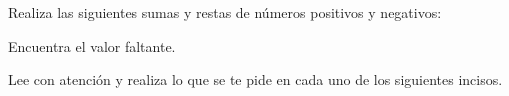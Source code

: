 \documentclass[11pt,addpoints]{exam}
\begin{document}
\begin{questions}
    \begin{parts}
        
        
    \end{parts}

    Realiza las siguientes sumas y restas de n\'umeros positivos y negativos:
    \begin{parts}
        
        
    \end{parts}

    Encuentra el valor faltante.
    \begin{multicols}{2}
        \begin{parts}
            
            
        \end{parts}
    \end{multicols}

    Lee con atenci\'on y realiza lo que se te pide en cada uno de los siguientes incisos.
    \begin{multicols}{2}
        \begin{parts}
            
            
        \end{parts}
    \end{multicols}
\end{questions}
\end{document}
